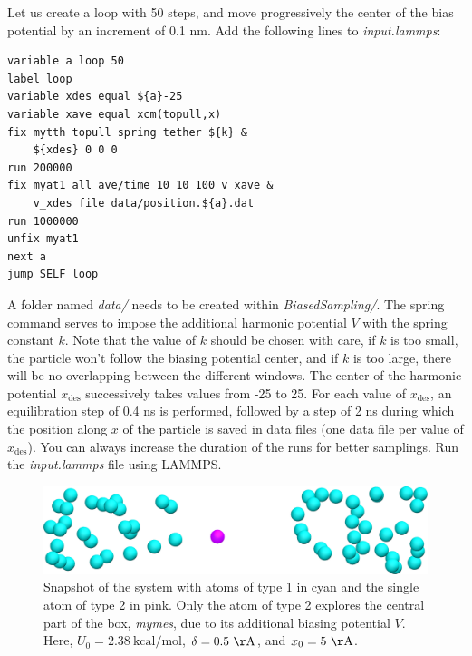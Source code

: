\documentclass[9pt,tutorial]{livecoms}
\begin{document}
Let us create a loop with 50 steps, and move progressively the center of the bias potential by an increment of 0.1 nm. Add the following lines to \textit{input.lammps}:
{\normalsize \begin{verbatim}
variable a loop 50
label loop
variable xdes equal ${a}-25
variable xave equal xcm(topull,x)
fix mytth topull spring tether ${k} &
    ${xdes} 0 0 0
run 200000
fix myat1 all ave/time 10 10 100 v_xave &
    v_xdes file data/position.${a}.dat
run 1000000
unfix myat1
next a
jump SELF loop
\end{verbatim}}
A folder named \textit{data/} needs to be created within \textit{BiasedSampling/}. The spring command serves to impose the additional harmonic potential $V$ with the spring constant $k$. Note that the value of $k$ should be chosen with care, if $k$ is too small, the particle won't follow the biasing potential center, and if $k$ is too large, there will be no overlapping between the different windows. The center of the harmonic potential $x_\text{des}$ successively takes values from -25 to 25. For each value of $x_\text{des}$, an equilibration step of 0.4 ns is performed, followed by a step of 2 ns during which the position along $x$ of the particle is saved in data files (one data file per value of $x_\text{des}$). You can always increase the duration of the runs for better samplings. Run the \textit{input.lammps}  file using LAMMPS.

\begin{figure}
\centering
\includegraphics[width=\linewidth]{US-system-biased}
\caption{Snapshot of the system with atoms of type 1 in cyan and the single atom of type 2 in pink. Only the atom of type 2 explores the central part of the box, \textit{mymes}, due to its additional biasing potential $V$. Here, $U_0 = 2.38~\text{kcal/mol}$, $\delta = 0.5~\mathrm{\AA{}}$, and $x_0 = 5~\mathrm{\AA{}}$.}
\label{fig:US-system-biased}
\end{figure}
    
\end{document}
